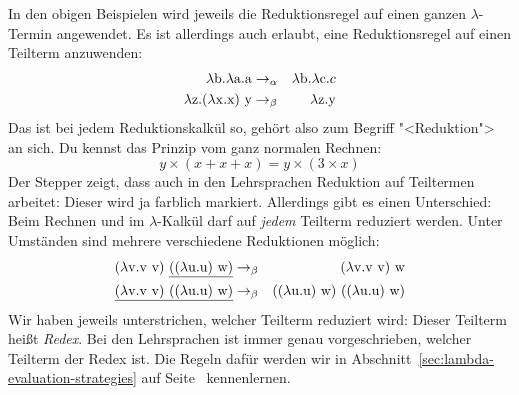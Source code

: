 %
In den obigen Beispielen wird jeweils die Reduktionsregel auf einen
ganzen $\lambda$-Termin angewendet.  Es ist allerdings auch erlaubt,
eine Reduktionsregel auf einen Teilterm anzuwenden:
%
\begin{eqnarray*}
  \lambda \mathrm b.\lambda \mathrm a.\mathrm a & \rightarrow_{\alpha} & \lambda \mathrm b.\lambda \mathrm c.c\\
  \lambda \mathrm z.(\lambda \mathrm x.\mathrm x)~\mathrm y & \rightarrow_{\beta}
                                                              & \lambda \mathrm z.\mathrm y
\end{eqnarray*}
%
Das ist bei jedem Reduktionskalkül so, gehört also zum Begriff
"<Reduktion"> an sich.  Du kennst das Prinzip vom ganz normalen
Rechnen:
%
\begin{displaymath}
  y \times (x + x + x) = y \times (3\times x)
\end{displaymath}
%
Der Stepper zeigt, dass auch in den Lehrsprachen Reduktion auf
Teiltermen arbeitet: Dieser wird ja farblich markiert.  Allerdings
gibt es einen Unterschied: Beim Rechnen und im $\lambda$-Kalkül darf
auf \emph{jedem} Teilterm reduziert werden.  Unter Umständen sind
mehrere verschiedene Reduktionen möglich:
%
\begin{eqnarray*}
  (\lambda \mathrm v .\mathrm v~\mathrm v)~\underline{((\lambda \mathrm u.\mathrm u)~\mathrm w)}
  & \rightarrow_{\beta} & (\lambda \mathrm v .\mathrm v~\mathrm v)~\mathrm w\\
  \underline{(\lambda \mathrm v .\mathrm v~\mathrm v)~((\lambda \mathrm u.\mathrm u)~\mathrm w)}
  & \rightarrow_{\beta} & ((\lambda \mathrm u.\mathrm u)~\mathrm w)~((\lambda \mathrm u.\mathrm u)~\mathrm w)
\end{eqnarray*}
%
Wir haben jeweils unterstrichen, welcher Teilterm reduziert wird:
Dieser Teilterm heißt \textit{Redex}.  Bei den
Lehrsprachen ist immer genau vorgeschrieben, welcher Teilterm der
Redex ist.  Die Regeln dafür werden wir in
Abschnitt~\ref{sec:lambda-evaluation-strategies} auf
Seite~\pageref{sec:lambda-evaluation-strategies} kennenlernen.


